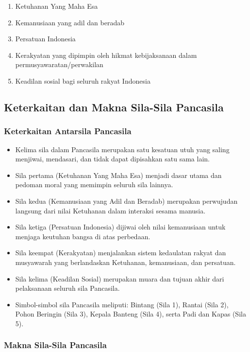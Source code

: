 \begin{enumerate}
\item Ketuhanan Yang Maha Esa
\item Kemanusiaan yang adil dan beradab
\item Persatuan Indonesia
\item Kerakyatan yang dipimpin oleh hikmat kebijaksanaan dalam permusyawaratan/perwakilan
\item Keadilan sosial bagi seluruh rakyat Indonesia
\end{enumerate}

\subsection{Keterkaitan dan Makna Sila-Sila Pancasila}

\subsubsection{Keterkaitan Antarsila Pancasila}

\begin{itemize}
\item Kelima sila dalam Pancasila merupakan satu kesatuan utuh yang saling menjiwai, mendasari, dan tidak dapat dipisahkan satu sama lain.
\item Sila pertama (Ketuhanan Yang Maha Esa) menjadi dasar utama dan pedoman moral yang memimpin seluruh sila lainnya.
\item Sila kedua (Kemanusiaan yang Adil dan Beradab) merupakan perwujudan langsung dari nilai Ketuhanan dalam interaksi sesama manusia.
\item Sila ketiga (Persatuan Indonesia) dijiwai oleh nilai kemanusiaan untuk menjaga keutuhan bangsa di atas perbedaan.
\item Sila keempat (Kerakyatan) menjalankan sistem kedaulatan rakyat dan musyawarah yang berlandaskan Ketuhanan, kemanusiaan, dan persatuan.
\item Sila kelima (Keadilan Sosial) merupakan muara dan tujuan akhir dari pelaksanaan seluruh sila Pancasila.
\item Simbol-simbol sila Pancasila meliputi: Bintang (Sila 1), Rantai (Sila 2), Pohon Beringin (Sila 3), Kepala Banteng (Sila 4), serta Padi dan Kapas (Sila 5).
\end{itemize}

\subsubsection{Makna Sila-Sila Pancasila}

